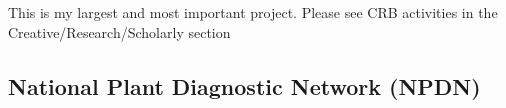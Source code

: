 \documentclass[12pt,english]{scrartcl}
\begin{document}
This is my largest and most important project. Please see CRB activities in the Creative/Research/Scholarly section

\subsection{National Plant Diagnostic Network (NPDN)}

\begin{comment}


I serve as the UOG Coordinator for the National Plant Diagnostic Network. 

\raggedright\vspace{2mm}\textbf{Activity}
\begin{itemize}
\item Participated in monthly conference calls.
\item Prepared an annual work plan and budget \cite{moore2018university}.
\item Prepared annual report \cite{moore2018npdnaccomplishments}.
\item Served on the NPDN IT Strategic Planning Committee.
\item Trained and certified 14 First Detectors as part of my AL/BI 345 General
Entomology course.
\end{itemize}
\raggedright\vspace{2mm}\textbf{Reference(s)}

\begin{btSect}[vancouver]{zotero}
\btPrintCited
\end{btSect}
\newpage{}
\end{btUnit}

\begin{btUnit}

\section{Guam Invasive Species Advisory Committee (GISAC) and Guam Invasive
Species Council (GISC)}

\raggedright\vspace{2mm}\textbf{Activity}
\begin{itemize}
\item I am a founding member and regular participant in GISAC.
\item President Underwood delegated me to represent UOG as a voting member
of GISC.
\item During 2018, I served on a GISC Import Data Harmonization Committee.
This committee generated recommendations \cite{guerrero2018guaminvasive}
resulting in a bill to amend the Guam Invasive Species Act \cite{guerrero2018billto}.
\end{itemize}
\raggedright\vspace{2mm}\textbf{Reference(s)}

\begin{btSect}[vancouver]{zotero}
\btPrintCited
\end{btSect}
\newpage{}
\end{btUnit}

\begin{btUnit}
\end{comment}
\end{document}
